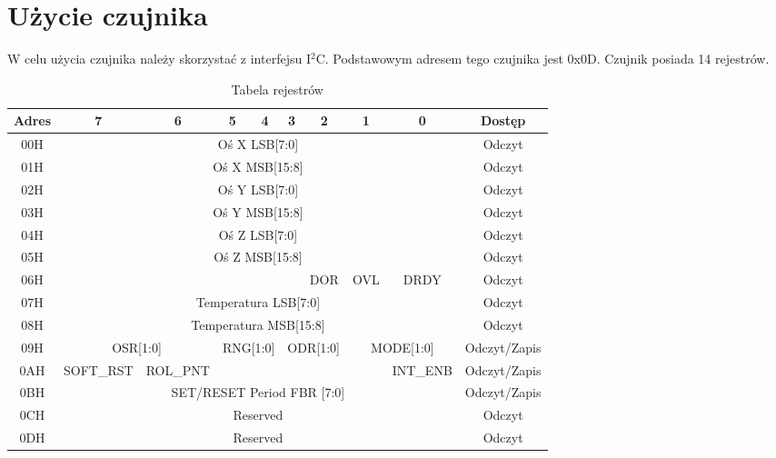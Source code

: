 \documentclass[11pt, a4paper]{article}
\begin{document}
\section*{Użycie czujnika}
W celu użycia czujnika należy skorzystać z interfejsu I$^{2}$C. Podstawowym adresem tego czujnika jest 0x0D. Czujnik posiada 14 rejestrów.
\begin{table}[h!]
\centering
\begin{tabular}{|c|cccccccc|c|}
\hline
Adres &
  \multicolumn{1}{c|}{7} &
  \multicolumn{1}{c|}{6} &
  \multicolumn{1}{c|}{5} &
  \multicolumn{1}{c|}{4} &
  \multicolumn{1}{c|}{3} &
  \multicolumn{1}{c|}{2} &
  \multicolumn{1}{c|}{1} &
  0 &
  Dostęp \\ \hline
00H &
  \multicolumn{8}{c|}{Oś X LSB[7:0]} &
  Odczyt \\ \hline
01H &
  \multicolumn{8}{c|}{Oś X MSB[15:8]} &
  Odczyt \\ \hline
02H &
  \multicolumn{8}{c|}{Oś Y LSB[7:0]} &
  Odczyt \\ \hline
03H &
  \multicolumn{8}{c|}{Oś Y MSB[15:8]} &
  Odczyt \\ \hline
04H &
  \multicolumn{8}{c|}{Oś Z LSB[7:0]} &
  Odczyt \\ \hline
05H &
  \multicolumn{8}{c|}{Oś Z MSB[15:8]} &
  Odczyt \\ \hline
06H &
  \multicolumn{1}{c|}{} &
  \multicolumn{1}{c|}{} &
  \multicolumn{1}{c|}{} &
  \multicolumn{1}{c|}{} &
  \multicolumn{1}{c|}{} &
  \multicolumn{1}{c|}{DOR} &
  \multicolumn{1}{c|}{OVL} &
  DRDY &
  Odczyt \\ \hline
07H &
  \multicolumn{8}{c|}{Temperatura LSB[7:0]} &
  Odczyt \\ \hline
08H &
  \multicolumn{8}{c|}{Temperatura MSB[15:8]} &
  Odczyt \\ \hline
09H &
  \multicolumn{2}{c|}{OSR[1:0]} &
  \multicolumn{2}{c|}{RNG[1:0]} &
  \multicolumn{2}{c|}{ODR[1:0]} &
  \multicolumn{2}{c|}{MODE[1:0]} &
  Odczyt/Zapis \\ \hline
0AH &
  \multicolumn{1}{c|}{SOFT\_RST} &
  \multicolumn{1}{c|}{ROL\_PNT} &
  \multicolumn{1}{c|}{} &
  \multicolumn{1}{c|}{} &
  \multicolumn{1}{c|}{} &
  \multicolumn{1}{c|}{} &
  \multicolumn{1}{c|}{} &
  INT\_ENB &
  Odczyt/Zapis \\ \hline
0BH &
  \multicolumn{8}{c|}{SET/RESET Period FBR [7:0]} &
  Odczyt/Zapis \\ \hline
0CH &
  \multicolumn{8}{c|}{Reserved} &
  Odczyt \\ \hline
0DH &
  \multicolumn{8}{c|}{Reserved} &
  Odczyt \\ \hline
\end{tabular}
\caption{Tabela rejestrów}
\end{table}
\end{document}
